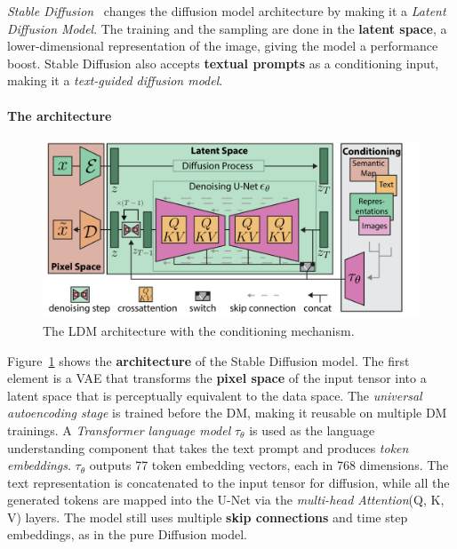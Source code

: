 \documentclass[preprint]{elsarticle}
\begin{document}
\emph{Stable Diffusion}~\cite{rombach2022highresolution} changes the diffusion model architecture by making 
it a \emph{Latent Diffusion Model}. 
The training and the sampling are done in the \textbf{latent space}, 
a lower-dimensional representation of the image, giving the model a performance boost.
Stable Diffusion also accepts \textbf{textual prompts} as a conditioning input, making it a \emph{text-guided diffusion model}.

\paragraph{The architecture}\label{sec:ldm-architecture} 

\begin{figure}[b]
	\centering
    \includegraphics[scale=0.9]{img/svg/SDArch.png}
	\caption{The LDM architecture with the conditioning mechanism.}\label{fig:ldm-architecture}
\end{figure}


Figure~\ref{fig:ldm-architecture} shows the \textbf{architecture} of the Stable Diffusion model.
The first element is a VAE that transforms the \textbf{pixel space} of the input tensor into a latent space that is  perceptually equivalent to the data space. The \emph{universal autoencoding stage} is trained before the DM,  making it reusable on multiple DM trainings. A \emph{Transformer language model} $\tau_\theta$ is used as the language understanding component  that takes the text prompt and produces \emph{token embeddings}. $\tau_\theta$ outputs 77 token embedding vectors, each in 768 dimensions. 
The text representation is concatenated to the input tensor for diffusion, while all the generated tokens are mapped into the  U-Net via the \emph{multi-head Attention}(Q, K, V) layers. The model still uses multiple \textbf{skip connections} and time step embeddings,
as in the pure Diffusion model.
\end{document}
